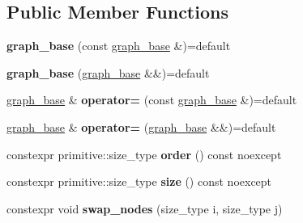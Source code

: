 \subsection*{Public Member Functions}
\begin{DoxyCompactItemize}
\item 
\mbox{\label{classsequoia_1_1maths_1_1graph__base_a786a2a82b45ee1847e0e2aad93894989}} 
{\bfseries graph\+\_\+base} (const \mbox{\hyperlink{classsequoia_1_1maths_1_1graph__base}{graph\+\_\+base}} \&)=default
\item 
\mbox{\label{classsequoia_1_1maths_1_1graph__base_a66b07b032366bf0faf163d8bc35f0bb9}} 
{\bfseries graph\+\_\+base} (\mbox{\hyperlink{classsequoia_1_1maths_1_1graph__base}{graph\+\_\+base}} \&\&)=default
\item 
\mbox{\label{classsequoia_1_1maths_1_1graph__base_adb92a6016869fb5771a84b823ee795e9}} 
\mbox{\hyperlink{classsequoia_1_1maths_1_1graph__base}{graph\+\_\+base}} \& {\bfseries operator=} (const \mbox{\hyperlink{classsequoia_1_1maths_1_1graph__base}{graph\+\_\+base}} \&)=default
\item 
\mbox{\label{classsequoia_1_1maths_1_1graph__base_a13984b8d14bcc6d04fc67cfd48f5f79d}} 
\mbox{\hyperlink{classsequoia_1_1maths_1_1graph__base}{graph\+\_\+base}} \& {\bfseries operator=} (\mbox{\hyperlink{classsequoia_1_1maths_1_1graph__base}{graph\+\_\+base}} \&\&)=default
\item 
\mbox{\label{classsequoia_1_1maths_1_1graph__base_a29a4e1d83a87e7c339af278a573ae51e}} 
constexpr primitive\+::size\+\_\+type {\bfseries order} () const noexcept
\item 
\mbox{\label{classsequoia_1_1maths_1_1graph__base_ac7743d1e2d803d91f3547769b3e2fd7d}} 
constexpr primitive\+::size\+\_\+type {\bfseries size} () const noexcept
\item 
\mbox{\label{classsequoia_1_1maths_1_1graph__base_a47bacd2540cedc9108116af317276621}} 
constexpr void {\bfseries swap\+\_\+nodes} (size\+\_\+type i, size\+\_\+type j)

\end{DoxyCompactItemize}
